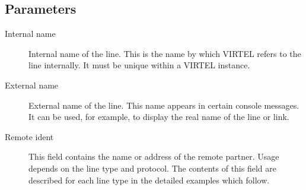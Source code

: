 \documentclass[letterpaper,10pt,english]{sphinxmanual}
\begin{document}
\ignorespaces 

\subsection{Parameters}
\label{\detokenize{connectivity_guide:parameters}}\label{\detokenize{connectivity_guide:index-8}}\begin{description}
\item[{Internal name}] \leavevmode
Internal name of the line. This is the name by which VIRTEL refers to the line internally. It must be unique within a VIRTEL instance.

\item[{External name}] \leavevmode
External name of the line. This name appears in certain console messages. It can be used, for example, to display the real name of the line or link.

\item[{Remote ident}] \leavevmode
This field contains the name or address of the remote partner. Usage
depends on the line type and protocol. The contents of this field
are described for each line type in the detailed examples which
follow.

\end{description}
\end{document}
